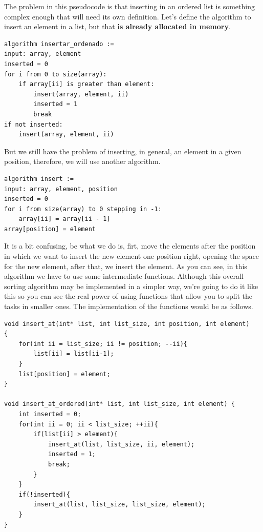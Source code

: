 \documentclass[a4paper]{article}
\begin{document}
The problem in this pseudocode is that inserting in an ordered list is something
complex enough that will need its own definition. Let's define the algorithm to
insert an element in a list, but that \textbf{is already allocated in memory}.

\noindent
\begin{minipage}[H]{\linewidth}
\mbox{}
\begin{lstlisting}[style=pseudoCode]
algorithm insertar_ordenado :=
input: array, element
inserted = 0
for i from 0 to size(array):
    if array[ii] is greater than element:
        insert(array, element, ii)
        inserted = 1
        break
if not inserted:
    insert(array, element, ii)
\end{lstlisting}
\end{minipage}

But we still have the problem of inserting, in general, an element in a given
position, therefore, we will use another algorithm.

\noindent
\begin{minipage}[H]{\linewidth}
\mbox{}
\begin{lstlisting}[style=pseudoCode]
algorithm insert :=
input: array, element, position
inserted = 0
for i from size(array) to 0 stepping in -1:
    array[ii] = array[ii - 1]
array[position] = element
\end{lstlisting}
\end{minipage}

It is a bit confusing, be what we do is, firt, move the elements after the
position in which we want to insert the new element one position right, opening
the space for the new element, after that, we insert the element. As you can
see, in this algorithm we have to use some intermediate functions. Although this
overall sorting algorithm may be implemented in a simpler way, we're going to
do it like this so you can see the real power of using functions that allow you
to split the tasks in smaller ones. The implementation of the functions would
be as follows.

\noindent
\begin{minipage}[H]{\linewidth}
\mbox{}
\begin{lstlisting}[style=C,
caption={Auxiliary algorithms for insertion sort},
label={lst:insertionAuxiliar}]
void insert_at(int* list, int list_size, int position, int element)
{
    for(int ii = list_size; ii != position; --ii){
        list[ii] = list[ii-1];
    }
    list[position] = element;
}

void insert_at_ordered(int* list, int list_size, int element) {
    int inserted = 0;
    for(int ii = 0; ii < list_size; ++ii){
        if(list[ii] > element){
            insert_at(list, list_size, ii, element);
            inserted = 1;
            break;
        }
    }
    if(!inserted){
        insert_at(list, list_size, list_size, element);
    }
}
\end{lstlisting}
\end{minipage}
\end{document}
